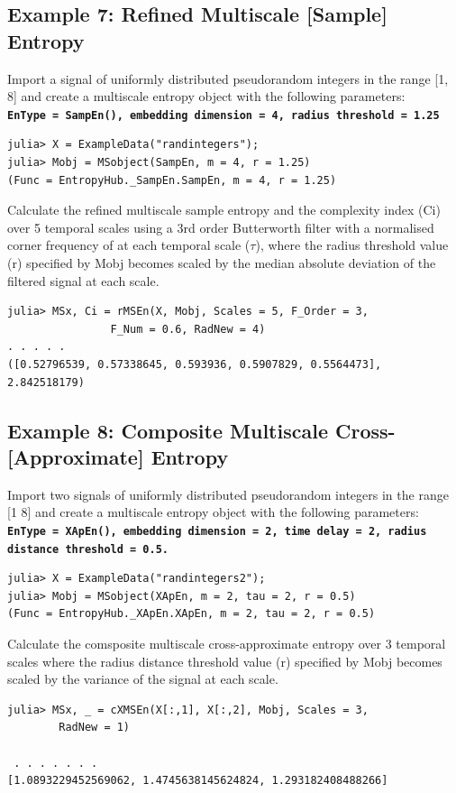 \documentclass[12pt, a4paper, titlepage, openany]{book}
\begin{document}
\newpage
\subsection{\normalsize Example 7: \hspace{15mm} Refined Multiscale [Sample] Entropy}
\noindent Import a signal of uniformly distributed pseudorandom integers in the range [1, 8] and create a multiscale entropy object with the following parameters:\\
\textbf{\texttt{EnType =  SampEn(), embedding dimension = 4, radius threshold = 1.25}}
\begin{verbatim}
julia> X = ExampleData("randintegers");
julia> Mobj = MSobject(SampEn, m = 4, r = 1.25)
(Func = EntropyHub._SampEn.SampEn, m = 4, r = 1.25)
\end{verbatim}      
Calculate the refined multiscale sample entropy and the complexity index (Ci) over 5 temporal scales using a 3rd order Butterworth filter with a normalised corner frequency of  at each temporal scale ($\tau$), where the radius threshold value (r) specified by Mobj becomes scaled by the median absolute deviation of the filtered signal at each scale.
\begin{verbatim}
julia> MSx, Ci = rMSEn(X, Mobj, Scales = 5, F_Order = 3, 
                F_Num = 0.6, RadNew = 4)
. . . . . 
([0.52796539, 0.57338645, 0.593936, 0.5907829, 0.5564473], 
2.842518179)
\end{verbatim}


\newpage
\subsection{\normalsize Example 8: \hspace{15mm}Composite Multiscale Cross-[Approximate] Entropy}
\noindent Import two signals of uniformly distributed pseudorandom integers in the range [1 8] and create a multiscale entropy object with the following parameters:\\
\texttt{\textbf{EnType =  XApEn(), embedding dimension = 2, time delay = 2, radius distance threshold = 0.5.}}
\begin{verbatim}
julia> X = ExampleData("randintegers2");
julia> Mobj = MSobject(XApEn, m = 2, tau = 2, r = 0.5)
(Func = EntropyHub._XApEn.XApEn, m = 2, tau = 2, r = 0.5)
\end{verbatim}
Calculate the comsposite multiscale cross-approximate entropy over 3 temporal scales where the radius distance threshold value (r) specified by Mobj becomes scaled by the variance of the signal at each scale.
\begin{verbatim}
julia> MSx, _ = cXMSEn(X[:,1], X[:,2], Mobj, Scales = 3, 
		RadNew = 1)

 . . . . . . .
[1.0893229452569062, 1.4745638145624824, 1.293182408488266]
\end{verbatim}
\end{document}

